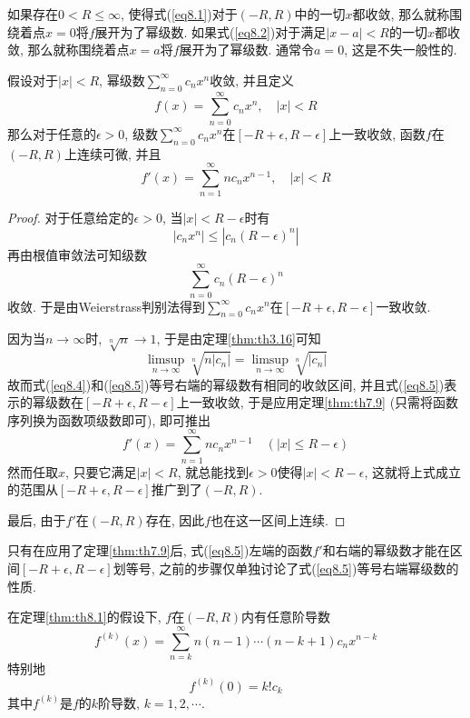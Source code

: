 \documentclass[cn,12pt,math=mtpro2,citestyle=gb7714-2015,bibstyle=gb7714-2015,twocol]{elegantbook}
\begin{document}
如果存在$0<R\leq\infty$, 使得式(\ref{eq8.1})对于$(-R,R)$中的一切$x$都收敛, 那么就称围绕着点$x=0$将$f$展开为了幂级数. 如果式(\ref{eq8.2})对于满足$|x-a| <R$的一切$x$都收敛, 那么就称围绕着点$x=a$将$f$展开为了幂级数. 通常令$a=0$, 这是不失一般性的.

\begin{theorem}\label{thm:th8.1}
  假设对于$|x|<R$, 幂级数$\sum_{n=0}^{\infty}c_nx^n$收敛, 并且定义
  \begin{equation}\label{eq8.4}
    f(x)=\sum_{n=0}^{\infty}c_nx^n, \quad |x|<R
  \end{equation}
  那么对于任意的$\epsilon>0$, 级数$\sum_{n=0}^{\infty}c_nx^n$在$[-R+\epsilon,R-\epsilon]$上一致收敛, 函数$f$在$(-R,R)$上连续可微, 并且
  \begin{equation}\label{eq8.5}
    f'(x)=\sum_{n=1}^{\infty}nc_nx^{n-1}, \quad |x|<R
  \end{equation}
\end{theorem}
\begin{proof}
  对于任意给定的$\epsilon>0$, 当$|x|<R-\epsilon$时有
  $$|c_nx^n|\leq|c_n(R-\epsilon)^n|$$
  再由根值审敛法可知级数
  $$\sum_{n=0}^{\infty}c_n(R-\epsilon)^n$$
  收敛. 于是由Weierstrass判别法得到$\sum_{n=0}^{\infty}c_nx^n$在$[-R+\epsilon,R-\epsilon]$一致收敛.

  因为当$n\to\infty$时, $\sqrt[n]{n}\to1$, 于是由定理\ref{thm:th3.16}可知
  $$\limsup_{n\to\infty}\sqrt[n]{n|c_n|}=\limsup_{n\to\infty}\sqrt[n]{|c_n|}$$
  故而式(\ref{eq8.4})和(\ref{eq8.5})等号右端的幂级数有相同的收敛区间, 并且式(\ref{eq8.5})表示的幂级数在$[-R+\epsilon,R-\epsilon]$上一致收敛, 于是应用定理\ref{thm:th7.9} (只需将函数序列换为函数项级数即可), 即可推出
  $$f'(x)=\sum_{n=1}^{\infty}nc_nx^{n-1}\quad (|x|\leq R-\epsilon)$$
  然而任取$x$, 只要它满足$|x|<R$, 就总能找到$\epsilon>0$使得$|x|<R-\epsilon$, 这就将上式成立的范围从$[-R+\epsilon,R-\epsilon]$推广到了$(-R,R)$.

  最后, 由于$f'$在$(-R,R)$存在, 因此$f$也在这一区间上连续.

\end{proof}
\begin{remark}
只有在应用了定理\ref{thm:th7.9}后, 式(\ref{eq8.5})左端的函数$f'$和右端的幂级数才能在区间$[-R+\epsilon, R-\epsilon]$划等号, 之前的步骤仅单独讨论了式(\ref{eq8.5})等号右端幂级数的性质.
\end{remark}
\begin{corollary}\label{cor:cor8.1}
在定理\ref{thm:th8.1}的假设下, $f$在$(-R,R)$内有任意阶导数
$$f^{(k)}(x)=\sum_{n=k}^{\infty}n(n-1)\cdots(n-k+1)c_nx^{n-k}$$
特别地
$$f^{(k)}(0)=k!c_k$$
其中$f^{(k)}$是$f$的$k$阶导数, $k=1,2,\cdots$.
\end{corollary}
\end{document}
